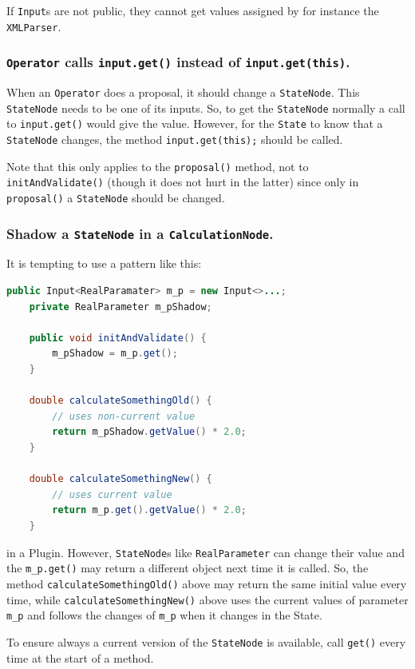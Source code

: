 \documentclass{article}
\begin{document}
If {\tt Input}s are not public, they cannot get values assigned by for
instance the {\tt XMLParser}.

\subsubsection{{\tt Operator} calls {\tt input.get()} instead of {\tt input.get(this)}.}

When an {\tt Operator} does a proposal, it should change a {\tt StateNode}.
This {\tt StateNode} needs to be one of its inputs. So, to get the {\tt StateNode}
normally a call to {\tt input.get()} would give the value. However, for the
{\tt State} to know that a {\tt StateNode} changes, the method {\tt input.get(this);}
should be called.

Note that this only applies to the {\tt proposal()} method, not to {\tt initAndValidate()}
(though it does not hurt in the latter) since only in {\tt proposal()} a {\tt StateNode}
should be changed.

\subsubsection{Shadow a {\tt StateNode} in a {\tt CalculationNode}.}

It is tempting to use a pattern like this:

{\color{blue}\begin{lstlisting}[language=java]
public Input<RealParamater> m_p = new Input<>...;
    private RealParameter m_pShadow;

    public void initAndValidate() {
        m_pShadow = m_p.get();
    }
    
    double calculateSomethingOld() {
        // uses non-current value
        return m_pShadow.getValue() * 2.0;
    }

    double calculateSomethingNew() {
        // uses current value
        return m_p.get().getValue() * 2.0;
    }
\end{lstlisting}}

in a Plugin. However, {\tt StateNode}s like {\tt RealParameter} can change their
value and the {\tt m\_p.get()} may return a different object next time it is called.
So, the method {\tt calculateSomethingOld()} above may return the same initial value
every time, while {\tt calculateSomethingNew()} above uses the current values of
parameter {\tt m\_p} and follows the changes of {\tt m\_p} when it changes in the State.

To ensure always a current version of the {\tt StateNode} is available, call
{\tt get()} every time at the start of a method.
\end{document}

